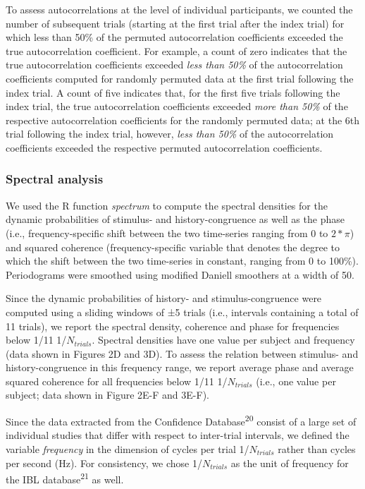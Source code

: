 \documentclass[
]{article}
\begin{document}
To assess autocorrelations at the level of individual participants, we
counted the number of subsequent trials (starting at the first trial
after the index trial) for which less than 50\% of the permuted
autocorrelation coefficients exceeded the true autocorrelation
coefficient. For example, a count of zero indicates that the true
autocorrelation coefficients exceeded \emph{less than 50\%} of the
autocorrelation coefficients computed for randomly permuted data at the
first trial following the index trial. A count of five indicates that,
for the first five trials following the index trial, the true
autocorrelation coefficients exceeded \emph{more than 50\%} of the
respective autocorrelation coefficients for the randomly permuted data;
at the 6th trial following the index trial, however, \emph{less than
50\%} of the autocorrelation coefficients exceeded the respective
permuted autocorrelation coefficients.

\hypertarget{spectral-analysis}{%
\subsubsection{Spectral analysis}\label{spectral-analysis}}

We used the R function \emph{spectrum} to compute the spectral densities
for the dynamic probabilities of stimulus- and history-congruence as
well as the phase (i.e., frequency-specific shift between the two
time-series ranging from 0 to \(2*\pi\)) and squared coherence
(frequency-specific variable that denotes the degree to which the shift
between the two time-series in constant, ranging from 0 to 100\%).
Periodograms were smoothed using modified Daniell smoothers at a width
of 50.

Since the dynamic probabilities of history- and stimulus-congruence were
computed using a sliding windows of ±5 trials (i.e., intervals
containing a total of 11 trials), we report the spectral density,
coherence and phase for frequencies below 1/11 1/\(N_{trials}\).
Spectral densities have one value per subject and frequency (data shown
in Figures 2D and 3D). To assess the relation between stimulus- and
history-congruence in this frequency range, we report average phase and
average squared coherence for all frequencies below 1/11
1/\(N_{trials}\) (i.e., one value per subject; data shown in Figure 2E-F
and 3E-F).

Since the data extracted from the Confidence
Database\textsuperscript{20} consist of a large set of individual
studies that differ with respect to inter-trial intervals, we defined
the variable \emph{frequency} in the dimension of cycles per trial
1/\(N_{trials}\) rather than cycles per second (Hz). For consistency, we
chose 1/\(N_{trials}\) as the unit of frequency for the IBL
database\textsuperscript{21} as well.
\end{document}
